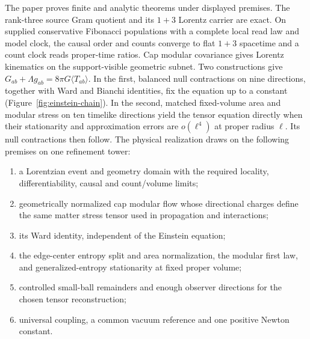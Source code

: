 \documentclass[11pt]{article}
\begin{document}
The paper proves finite and analytic theorems under displayed premises. The
rank-three source Gram quotient and its $1+3$ Lorentz carrier are exact. On
supplied conservative Fibonacci populations with a complete local read law and
model clock, the causal order and counts converge to flat $1+3$ spacetime and a
count clock reads proper-time ratios. Cap modular covariance gives Lorentz
kinematics on the support-visible geometric subnet. Two constructions give
$G_{ab}+\Lambda g_{ab}=8\pi G\langle T_{ab}\rangle$. In the first,
balanced null contractions on nine directions, together with Ward and
Bianchi identities, fix the equation up to a constant
(Figure~\ref{fig:einstein-chain}). In the second, matched fixed-volume
area and modular stress on ten timelike directions yield the tensor
equation directly when their stationarity and approximation errors are
$o(\ell^4)$ at proper radius $\ell$. Its null contractions then follow.
The physical realization draws on the following premises on one refinement tower:
\begin{enumerate}\setlength{\itemsep}{1pt}
\item[(G1)] a Lorentzian event and geometry domain with the required
  locality, differentiability, causal and count/volume limits;
\item[(G2)] geometrically normalized cap modular flow whose directional charges
  define the same matter stress tensor used in propagation and interactions;
\item[(G3)] its Ward identity, independent of the Einstein equation;
\item[(G4)] the edge-center entropy split and area normalization, the modular
  first law, and generalized-entropy stationarity at fixed proper volume;
\item[(G5)] controlled small-ball remainders and enough observer
  directions for the chosen tensor reconstruction;
\item[(G6)] universal coupling, a common vacuum reference and one positive
  Newton constant.
\end{enumerate}
\end{document}
